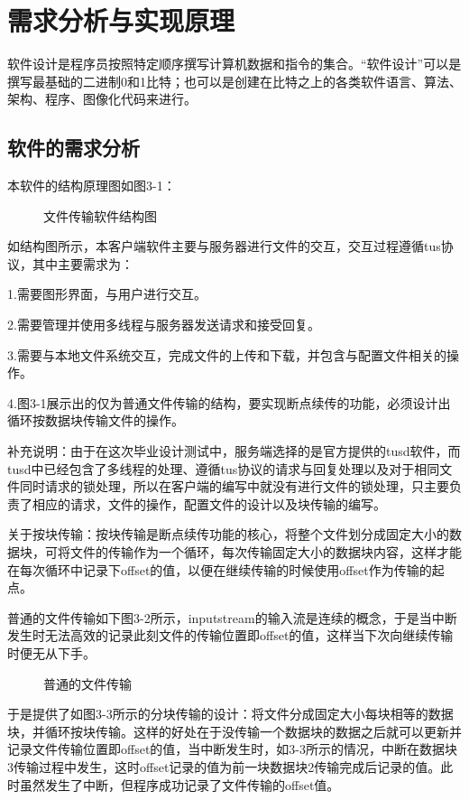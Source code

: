 \documentclass[bachelor]{thesis-uestc}
\begin{document}
\section{需求分析与实现原理}
软件设计是程序员按照特定顺序撰写计算机数据和指令的集合。“软件设计”可以是撰写最基础的二进制0和1比特；也可以是创建在比特之上的各类软件语言、算法、架构、程序、图像化代码来进行。
\subsection{软件的需求分析}
本软件的结构原理图如图3-1：
\begin{figure}[h]
\caption{文件传输软件结构图}
\end{figure}
如结构图所示，本客户端软件主要与服务器进行文件的交互，交互过程遵循tus协议，其中主要需求为：
\par 1.需要图形界面，与用户进行交互。
\par 2.需要管理并使用多线程与服务器发送请求和接受回复。
\par 3.需要与本地文件系统交互，完成文件的上传和下载，并包含与配置文件相关的操作。
\par 4.图3-1展示出的仅为普通文件传输的结构，要实现断点续传的功能，必须设计出循环按数据块传输文件的操作。
\par 补充说明：由于在这次毕业设计测试中，服务端选择的是官方提供的tusd软件，而tusd中已经包含了多线程的处理、遵循tus协议的请求与回复处理以及对于相同文件同时请求的锁处理，所以在客户端的编写中就没有进行文件的锁处理，只主要负责了相应的请求，文件的操作，配置文件的设计以及块传输的编写。
\par 关于按块传输：按块传输是断点续传功能的核心，将整个文件划分成固定大小的数据块，可将文件的传输作为一个循环，每次传输固定大小的数据块内容，这样才能在每次循环中记录下offset的值，以便在继续传输的时候使用offset作为传输的起点。
\par 普通的文件传输如下图3-2所示，inputstream的输入流是连续的概念，于是当中断发生时无法高效的记录此刻文件的传输位置即offset的值，这样当下次向继续传输时便无从下手。
\begin{figure}[h]
\caption{普通的文件传输}
\end{figure}
\par 于是提供了如图3-3所示的分块传输的设计：将文件分成固定大小每块相等的数据块，并循环按块传输。这样的好处在于没传输一个数据块的数据之后就可以更新并记录文件传输位置即offset的值，当中断发生时，如3-3所示的情况，中断在数据块3传输过程中发生，这时offset记录的值为前一块数据块2传输完成后记录的值。此时虽然发生了中断，但程序成功记录了文件传输的offset值。
\end{document}
